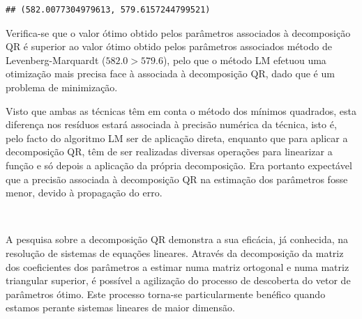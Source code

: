 \documentclass[]{article}
\numberwithin{equation}{subsection}
\begin{document}
\begin{Shaded}
\begin{Highlighting}[]
\OperatorTok{=}\OperatorTok{{-}}\NormalTok{ beta[}\NormalTok{]}\OperatorTok{*}\NormalTok{np.exp(beta[}\NormalTok{]}\OperatorTok{*}
\OperatorTok{=}  \OperatorTok{*}\OperatorTok{**}\NormalTok{)}

\OperatorTok{=}\NormalTok{ (}\NormalTok{, }\NormalTok{), (}\NormalTok{, }\NormalTok{)}
\end{Highlighting}
\end{Shaded}

\begin{verbatim}
## (582.0077304979613, 579.6157244799521)
\end{verbatim}

Verifica-se que o valor ótimo obtido pelos parâmetros associados à
decomposição QR é superior ao valor ótimo obtido pelos parâmetros
associados método de Levenberg-Marquardt (\(582.0 > 579.6\)), pelo que o
método LM efetuou uma otimização mais precisa face à associada à
decomposição QR, dado que é um problema de minimização.

Visto que ambas as técnicas têm em conta o método dos mínimos quadrados,
esta diferença nos resíduos estará associada à precisão numérica da
técnica, isto é, pelo facto do algoritmo LM ser de aplicação direta,
enquanto que para aplicar a decomposição QR, têm de ser realizadas
diversas operações para linearizar a função e só depois a aplicação da
própria decomposição. Era portanto expectável que a precisão associada à
decomposição QR na estimação dos parâmetros fosse menor, devido à
propagação do erro.

\(\ \)

A pesquisa sobre a decomposição QR demonstra a sua eficácia, já
conhecida, na resolução de sistemas de equações lineares. Através da
decomposição da matriz dos coeficientes dos parâmetros a estimar numa
matriz ortogonal e numa matriz triangular superior, é possível a
agilização do processo de descoberta do vetor de parâmetros ótimo. Este
processo torna-se particularmente benéfico quando estamos perante
sistemas lineares de maior dimensão.
\end{document}
